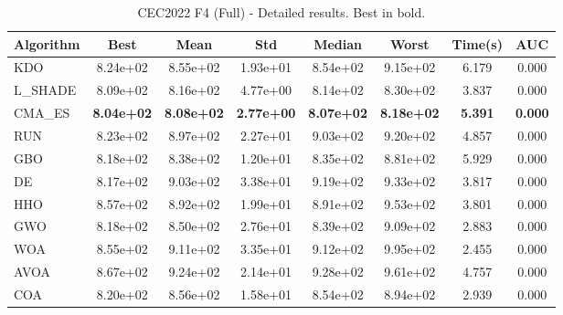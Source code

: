\begin{table}[H]
\centering\small
\caption{CEC2022 F4 (Full) - Detailed results. Best in bold.}
\label{tab:cec2022_F4}
\begin{tabular}{lccccccc}
\toprule
\textbf{Algorithm} & \textbf{Best} & \textbf{Mean} & \textbf{Std} & \textbf{Median} & \textbf{Worst} & \textbf{Time(s)} & \textbf{AUC} \\
\midrule
KDO & 8.24e+02 & 8.55e+02 & 1.93e+01 & 8.54e+02 & 9.15e+02 & 6.179 & 0.000 \\
L_SHADE & 8.09e+02 & 8.16e+02 & 4.77e+00 & 8.14e+02 & 8.30e+02 & 3.837 & 0.000 \\
CMA_ES & \textbf{8.04e+02} & \textbf{8.08e+02} & \textbf{2.77e+00} & \textbf{8.07e+02} & \textbf{8.18e+02} & \textbf{5.391} & \textbf{0.000} \\
RUN & 8.23e+02 & 8.97e+02 & 2.27e+01 & 9.03e+02 & 9.20e+02 & 4.857 & 0.000 \\
GBO & 8.18e+02 & 8.38e+02 & 1.20e+01 & 8.35e+02 & 8.81e+02 & 5.929 & 0.000 \\
DE & 8.17e+02 & 9.03e+02 & 3.38e+01 & 9.19e+02 & 9.33e+02 & 3.817 & 0.000 \\
HHO & 8.57e+02 & 8.92e+02 & 1.99e+01 & 8.91e+02 & 9.53e+02 & 3.801 & 0.000 \\
GWO & 8.18e+02 & 8.50e+02 & 2.76e+01 & 8.39e+02 & 9.09e+02 & 2.883 & 0.000 \\
WOA & 8.55e+02 & 9.11e+02 & 3.35e+01 & 9.12e+02 & 9.95e+02 & 2.455 & 0.000 \\
AVOA & 8.67e+02 & 9.24e+02 & 2.14e+01 & 9.28e+02 & 9.61e+02 & 4.757 & 0.000 \\
COA & 8.20e+02 & 8.56e+02 & 1.58e+01 & 8.54e+02 & 8.94e+02 & 2.939 & 0.000 \\
\bottomrule
\end{tabular}
\end{table}
